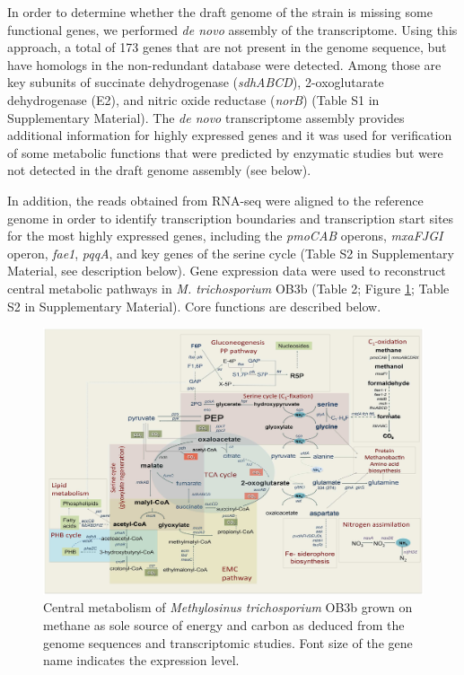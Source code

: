 In order to determine whether the draft genome of the strain is missing some functional genes, we performed \textit{de novo} assembly of the transcriptome.
Using this approach, a total of 173 genes that are not present in the genome sequence, but have homologs in the non-redundant database were detected.
Among those are key subunits of succinate dehydrogenase (\textit{sdhABCD}), 2-oxoglutarate dehydrogenase (E2), and nitric oxide reductase (\textit{norB}) (Table S1 in Supplementary Material).
The \textit{de novo} transcriptome assembly provides additional information for highly expressed genes and it was used for verification of some metabolic functions that were predicted by enzymatic studies but were not detected in the draft genome assembly (see below).

In addition, the reads obtained from RNA-seq were aligned to the reference genome in order to identify transcription boundaries and transcription start sites for the most highly expressed genes, including the \textit{pmoCAB} operons, \textit{mxaFJGI} operon, \textit{fae1}, \textit{pqqA}, and key genes of the serine cycle (Table S2 in Supplementary Material, see description below).
Gene expression data were used to reconstruct central metabolic pathways in \textit{M. trichosporium} OB3b (Table 2; Figure \ref{fig:A_metabolic_map}; Table S2 in Supplementary Material).
Core functions are described below.


\begin{figure}[H]
\centering
     \includegraphics[width=1.0\textwidth]{./tex/chapter1/figures/figure1.png}
     \begin{singlespace}
     \caption[Central metabolism of \textit{Methylosinus trichosporium} OB3b]{
        Central metabolism of \textit{Methylosinus trichosporium} OB3b grown on methane as sole source of energy and carbon as
        deduced from the genome sequences and transcriptomic studies.
        Font size of the gene name indicates the expression level.}
     \label{fig:A_metabolic_map}  %
     \end{singlespace}
\end{figure}

